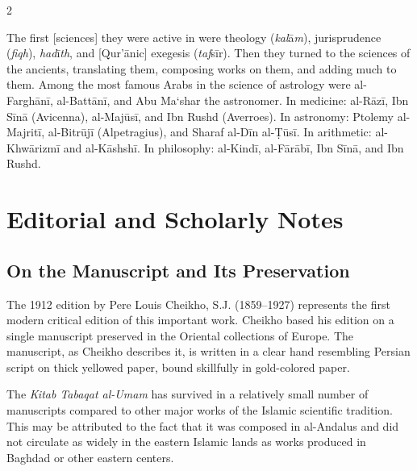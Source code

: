 \documentclass[11pt,a4paper]{article}
\begin{document}
\begin{paracol}{2}
\begin{rightcolumn}
\vspace{0.3cm}
The first [sciences] they were active in were theology (\textit{kal}\={a}\textit{m}), jurisprudence (\textit{fiqh}), \textit{had}\={i}\textit{th}, and [Qur\textquoteright \={a}nic] exegesis (\textit{taf}s\={i}r). Then they turned to the sciences of the ancients, translating them, composing works on them, and adding much to them. Among the most famous Arabs in the science of astrology were al-Fargh\={a}n\={i}, al-Batt\={a}n\={i}, and Abu Ma\textquoteleft shar the astronomer. In medicine: al-R\={a}z\={i}, Ibn S\={i}n\={a} (Avicenna), al-Maj\={u}s\={i}, and Ibn Rushd (Averroes). In astronomy: Ptolemy al-Majrit\={i}, al-Bitr\={u}j\={i} (Alpetragius), and Sharaf al-D\={i}n al-\d{T}\={u}s\={i}. In arithmetic: al-Khw\={a}rizm\={i} and al-K\={a}shsh\={i}. In philosophy: al-Kind\={i}, al-F\={a}r\={a}b\={i}, Ibn S\={i}n\={a}, and Ibn Rushd.
\end{rightcolumn}

\end{paracol}

\clearpage

\onecolumn
\section*{Editorial and Scholarly Notes}

\subsection*{On the Manuscript and Its Preservation}

The 1912 edition by Pere Louis Cheikho, S.J. (1859--1927) represents the first modern critical edition of this important work. Cheikho based his edition on a single manuscript preserved in the Oriental collections of Europe. The manuscript, as Cheikho describes it, is written in a clear hand resembling Persian script on thick yellowed paper, bound skillfully in gold-colored paper.

The \textit{Kitab Tabaqat al-Umam} has survived in a relatively small number of manuscripts compared to other major works of the Islamic scientific tradition. This may be attributed to the fact that it was composed in al-Andalus and did not circulate as widely in the eastern Islamic lands as works produced in Baghdad or other eastern centers.
\end{document}
